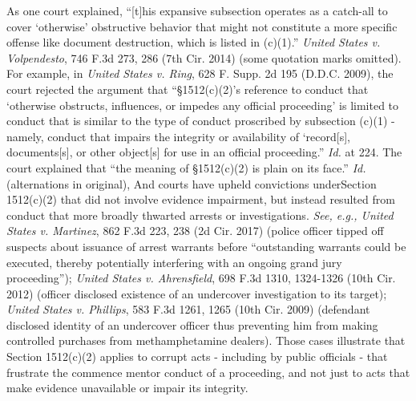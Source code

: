 As one court explained, “[t]his expansive subsection operates as a catch-all to cover ‘otherwise’ obstructive behavior that might not constitute a more specific offense like document destruction, which is listed in (c)(1).”
\textit{United States v. Volpendesto}, 746 F.3d 273, 286 (7th Cir. 2014) (some quotation marks omitted).
For example, in \textit{United States v. Ring}, 628 F. Supp. 2d 195 (D.D.C. 2009), the court rejected the argument that “\S 1512(c)(2)’s reference to conduct that ‘otherwise obstructs, influences, or impedes any official proceeding’ is limited to conduct that is similar to the type of conduct proscribed by subsection (c)(1) - namely, conduct that impairs the integrity or availability of ‘record[s], documents[s], or other object[s] for use in an official proceeding.”
\textit{Id.} at 224.
The court explained that “the meaning of \S 1512(c)(2) is plain on its face.”
\textit{Id.} (alternations in original), And courts have upheld convictions underSection 1512(c)(2) that did not involve evidence impairment, but instead resulted from conduct that more broadly thwarted arrests or investigations.
\textit{See, e.g., United States v. Martinez}, 862 F.3d 223, 238 (2d Cir. 2017) (police officer tipped off suspects about issuance of arrest warrants before “outstanding warrants could be executed, thereby potentially interfering with an ongoing grand jury proceeding”);
\textit{United States v. Ahrensfield}, 698 F.3d 1310, 1324-1326 (10th Cir. 2012) (officer disclosed existence of an undercover investigation to its target);
\textit{United States v. Phillips}, 583 F.3d 1261, 1265 (10th Cir. 2009) (defendant disclosed identity of an undercover officer thus preventing him from making controlled purchases from methamphetamine dealers).
Those cases illustrate that Section 1512(c)(2) applies to corrupt acts - including by public officials - that frustrate the commence mentor conduct of a proceeding, and not just to acts that make evidence unavailable or impair its integrity.

